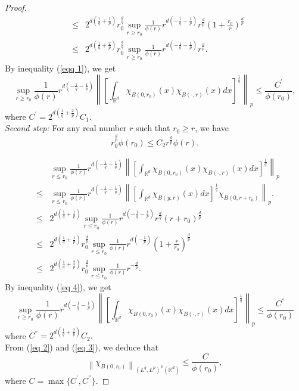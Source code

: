 \documentclass[a4paper,12pt,intlimits,oneside]{amsart}
\numberwithin{equation}{section}
\numberwithin{equation}{section}
\theoremstyle{definition}
\begin{document}
\begin{proof}
\begin{eqnarray*}
&\leq& 2^{d(\frac{1}{q}+\frac{1}{p})}r^{\frac{d}{q}}_{0}\sup_{r \ge r_{0}} \frac{1}{\phi(r)} r^{d(-\frac{1}{q}-\frac{1}{p})} r^{\frac{d}{p}}(1+\frac{r_{0}}{r})^{\frac{d}{p}} \\
&\leq& 2^{d(\frac{1}{q}+\frac{2}{p})}r^{\frac{d}{q}}_{0}\sup_{r \ge r_{0}} \frac{1}{\phi(r)} r^{d(-\frac{1}{q}-\frac{1}{p})} r^{\frac{d}{p}}.
\end{eqnarray*} 
By inequality (\ref{eqq 1}), we get 
\begin{equation}\label{eq 2}
\sup_{r \ge r_{0}} \frac{1}{\phi(r)} r^{d(-\frac{1}{q}-\frac{1}{p})} \left\|\left[\int_{\mathbb R^{d}}  \chi_{B(0,r_{0})}(x)\chi_{B(\cdot,r)}(x)dx\right]^{\frac{1}{q}}\right\|_p \leq \frac{C^{'}}{\phi(r_{0})},
\end{equation}
where $C^{'}= 2^{d(\frac{1}{q}+\frac{2}{p})}C_{1}.  $\\
\textit{Second step:} For any real number $r$ such that $ r_{0} \geq r$, we have
\begin{equation}\label{eq 4}
r_{0}^{\frac{d}{p}}\phi(r_{0}) \leq C_{2} r^{\frac{d}{p}}\phi(r).
\end{equation}

\begin{eqnarray*}
&&\sup_{r \leq r_{0}} \frac{1}{\phi(r)} r^{d(-\frac{1}{q}-\frac{1}{p})} \left\|\left[\int_{\mathbb R^{d}}  \chi_{B(0,r_{0})}(x)\chi_{B(\cdot,r)}(x)dx\right]^{\frac{1}{q}}\right\|_p \\&\leq& \sup_{r \leq r_{0}} \frac{1}{\phi(r)} r^{d(-\frac{1}{q}-\frac{1}{p})} \left\|\left[\int_{\mathbb R^{d}}  \chi_{B(y,r)}(x)dx\right]^{\frac{1}{q}}\chi_{B(0,r+r_{0})}\right\|_p. \\
 &\leq& 2^{d(\frac{1}{q}+\frac{1}{p})}
\sup_{r \leq r_{0}} \frac{1}{\phi(r)} r^{d(-\frac{1}{q}-\frac{1}{p})}r^{\frac{d}{q}} (r+r_{0})^{\frac{d}{p}}\\
&\leq& 2^{d(\frac{1}{q}+\frac{1}{p})}r_{0}^{\frac{d}{p}}\sup_{r \leq r_{0}} \frac{1}{\phi(r)} r^{d(-\frac{1}{p})} (1+\frac{r}{r_{0}})^{\frac{d}{p}} \\
&\leq& 2^{d(\frac{1}{q}+\frac{2}{p})}r^{\frac{d}{p}}_{0}\sup_{r \leq r_{0}} \frac{1}{\phi(r)} r^{-\frac{d}{p}}.
\end{eqnarray*} 
By inequality (\ref{eq 4}), we get 
\begin{equation}\label{eq 3}
\sup_{r \ge r_{0}} \frac{1}{\phi(r)} r^{d(-\frac{1}{q}-\frac{1}{p})} \left\|\left[\int_{\mathbb R^{d}}  \chi_{B(0,r_{0})}(x)\chi_{B(\cdot,r)}(x)dx\right]^{\frac{1}{q}}\right\|_p \leq \frac{C^{''}}{\phi(r_{0})}
\end{equation}
where $C^{''}= 2^{d(\frac{1}{q}+\frac{2}{p})}C_{2}.  $\\
From (\ref{eq 2}) and (\ref{eq 3}), we deduce that $$\left\| \chi_{B(0,r_{0})} \right\|_{(L^{q},L^{p})^{\phi }(\mathbb{R}^{d})} \leq \frac{C}{\phi(r_{0})},$$ where $C=\max\{C^{'},  C^{''}  \}$.
\end{proof}
\end{document}
